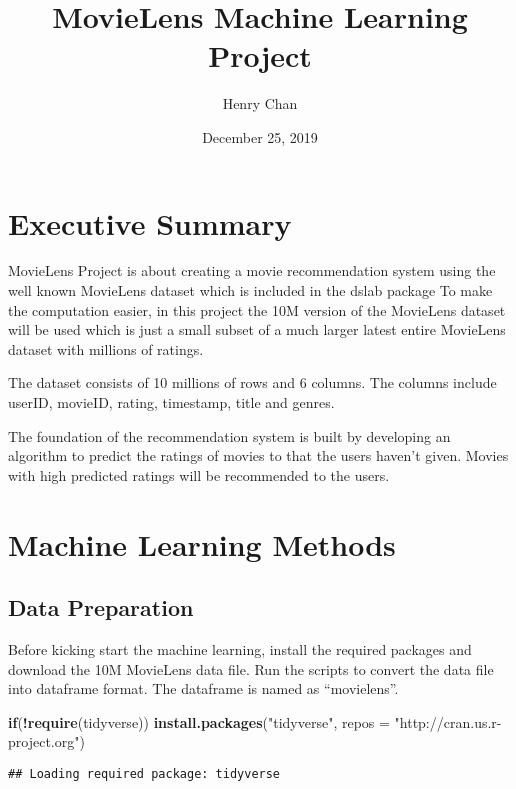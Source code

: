 \documentclass[]{article}
\title{MovieLens Machine Learning Project}
\author{Henry Chan}
\date{December 25, 2019}
\newenvironment{Shaded}{\begin{snugshade}}{\end{snugshade}}
\newcommand{\KeywordTok}[1]{\textcolor[rgb]{0.13,0.29,0.53}{\textbf{#1}}}
\newcommand{\DataTypeTok}[1]{\textcolor[rgb]{0.13,0.29,0.53}{#1}}
\newcommand{\StringTok}[1]{\textcolor[rgb]{0.31,0.60,0.02}{#1}}
\newcommand{\ControlFlowTok}[1]{\textcolor[rgb]{0.13,0.29,0.53}{\textbf{#1}}}
\newcommand{\OperatorTok}[1]{\textcolor[rgb]{0.81,0.36,0.00}{\textbf{#1}}}
\newcommand{\NormalTok}[1]{#1}
\begin{document}
\maketitle

\section{Executive Summary}\label{executive-summary}

MovieLens Project is about creating a movie recommendation system using
the well known MovieLens dataset which is included in the dslab package
To make the computation easier, in this project the 10M version of the
MovieLens dataset will be used which is just a small subset of a much
larger latest entire MovieLens dataset with millions of ratings.

The dataset consists of 10 millions of rows and 6 columns. The columns
include userID, movieID, rating, timestamp, title and genres.

The foundation of the recommendation system is built by developing an
algorithm to predict the ratings of movies to that the users haven't
given. Movies with high predicted ratings will be recommended to the
users.

\section{Machine Learning Methods}\label{machine-learning-methods}

\subsection{Data Preparation}\label{data-preparation}

Before kicking start the machine learning, install the required packages
and download the 10M MovieLens data file. Run the scripts to convert the
data file into dataframe format. The dataframe is named as
``movielens''.

\begin{Shaded}
\begin{Highlighting}[]
\ControlFlowTok{if}\NormalTok{(}\OperatorTok{!}\KeywordTok{require}\NormalTok{(tidyverse)) }\KeywordTok{install.packages}\NormalTok{(}\StringTok{"tidyverse"}\NormalTok{, }\DataTypeTok{repos =} \StringTok{"http://cran.us.r-project.org"}\NormalTok{)}
\end{Highlighting}
\end{Shaded}

\begin{verbatim}
## Loading required package: tidyverse
\end{verbatim}
\end{document}
